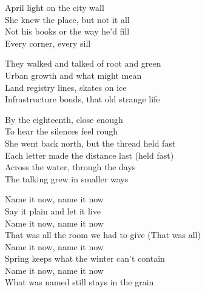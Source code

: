 \begin{lyrics}
April light on the city wall\\
She knew the place, but not it all\\
Not his books or the way he’d fill\\
Every corner, every sill

They walked and talked of root and green\\
Urban growth and what might mean\\
Land registry lines, skates on ice\\
Infrastructure bonds, that old strange life

By the eighteenth, close enough\\
To hear the silences feel rough\\
She went back north, but the thread held fast\\
Each letter made the distance last
(held fast)\\
Across the water, through the days\\
The talking grew in smaller ways

Name it now, name it now\\
Say it plain and let it live\\
Name it now, name it now\\
That was all the room we had to give
(That was all)\\
Name it now, name it now\\
Spring keeps what the winter can’t contain\\
Name it now, name it now\\
What was named still stays in the grain
\end{lyrics}

